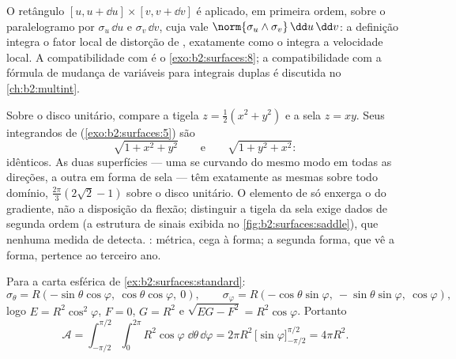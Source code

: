 \begin{remark}
O retângulo $[u, u + \dd u] \times [v, v + \dd v]$ é aplicado, em
primeira ordem, sobre o paralelogramo  por $\sigma_u\,\dd u$
e $\sigma_v\,\dd v$, cuja  vale $\norm{\sigma_u \wedge
\sigma_v}\,\dd u\,\dd v$: a definição integra o fator local
de distorção de , exatamente como o  integra a
velocidade local. A compatibilidade com  é o
\cref{exo:b2:surfaces:8}; a compatibilidade com a fórmula de mudança de
variáveis para integrais duplas é discutida no
\cref{ch:b2:multint}.
\end{remark}

\begin{example}\label{ex:b2:surfaces:samearea}
Sobre o disco unitário, compare a tigela $z = \frac12(x^2 + y^2)$
e a sela $z = xy$. Seus integrandos de 
(\cref{exo:b2:surfaces:5}) são
\[
\sqrt{1 + x^2 + y^2}
\qquad\text{e}\qquad
\sqrt{1 + y^2 + x^2} :
\]
idênticos. As duas superfícies --- uma se curvando do mesmo modo em
todas as direções, a outra em forma de sela --- têm exatamente
as mesmas  sobre todo domínio, $\frac{2\pi}3(2\sqrt2 - 1)$
sobre o disco unitário. O elemento de  só enxerga o
\emph{} do gradiente, não a disposição da
flexão; distinguir a tigela da sela exige dados de
segunda ordem (a estrutura de sinais exibida no
\cref{fig:b2:surfaces:saddle}), que nenhuma medida de 
detecta. : métrica, cega
à forma; a segunda forma, que vê a forma, pertence ao terceiro ano.
\end{example}

\begin{example}\label{ex:b2:surfaces:spherearea}
Para a carta esférica de \cref{ex:b2:surfaces:standard}:
\[
\sigma_\theta = R(-\sin\theta\cos\varphi,\
\cos\theta\cos\varphi,\ 0),
\qquad
\sigma_\varphi = R(-\cos\theta\sin\varphi,\
-\sin\theta\sin\varphi,\ \cos\varphi),
\]
logo $E = R^2\cos^2\varphi$, $F = 0$, $G = R^2$ e $\sqrt{EG - F^2}
= R^2\cos\varphi$. Portanto
\[
\mathcal{A}
= \int_{-\pi/2}^{\pi/2}\!\!\int_0^{2\pi}
R^2\cos\varphi\;\dd\theta\,\dd\varphi
= 2\pi R^2\,\bigl[\sin\varphi\bigr]_{-\pi/2}^{\pi/2}
= \boxed{4\pi R^2} .
\]
\end{example}

